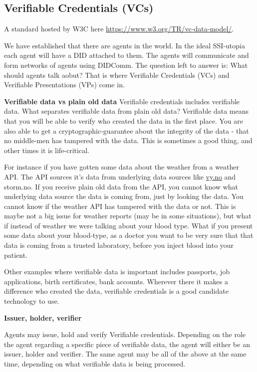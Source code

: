 \hypertarget{verifiable-credentials-vcs}{%
\subsection{Verifiable Credentials
(VCs)}\label{verifiable-credentials-vcs}}

A standard hosted by W3C here
\url{https://www.w3.org/TR/vc-data-model/}.

We have established that there are agents in the world. In the ideal
SSI-utopia each agent will have a DID attached to them. The agents will
communicate and form networks of agents using DIDComm. The question left
to answer is: What should agents talk aobut? That is where Verifiable
Credentials (VCs) and Verifiable Presentations (VPs) come in.

\textbf{Verifiable data vs plain old data} Verifiable credentials
includes verifiable data. What separates verifiable data from plain old
data? Verifiable data means that you will be able to verify who created
the data in the first place. You are also able to get a
cryptographic-guarantee about the integrity of the data - that no
middle-men has tampered with the data. This is sometimes a good thing,
and other times it is life-critical.

For instance if you have gotten some data about the weather from a
weather API. The API sources it's data from underlying data sources like
\href{http://vy.no}{vy.no} and storm.no. If you receive plain old data
from the API, you cannot know what underlying data source the data is
coming from, just by looking the data. You cannot know if the weather
API has tampered with the data or not. This is maybe not a big issue for
weather reports (may be in some situations), but what if instead of
weather we were talking about your blood type. What if you present some
data about your blood-type, as a doctor you want to be very sure that
that data is coming from a trusted laboratory, before you inject blood
into your patient.

Other examples where verifiable data is important includes passports,
job applications, birth certificates, bank accounts. Wherever there it
makes a difference who created the data, verifiable credentials is a
good candidate technology to use.

\textbf{Issuer, holder, verifier}

Agents may issue, hold and verify Verifiable credentials. Depending on
the role the agent regarding a specific piece of verifiable data, the
agent will either be an issuer, holder and verifier. The same agent may
be all of the above at the same time, depending on what verifiable data
is being processed.

